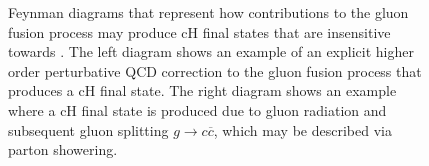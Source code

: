 \begin{figure}
\begin{subfigure}{0.48\textwidth}
    \end{subfigure}
    \caption{Feynman diagrams that represent how contributions to the gluon fusion process may produce cH final states that are insensitive towards \kappac. The left diagram shows an example of an explicit higher order perturbative QCD correction to the gluon fusion process that produces a cH final state. The right diagram shows an example where a cH final state is produced due to gluon radiation and subsequent gluon splitting $g\rightarrow c\overline{c}$, which may be described via parton showering.}
    \label{fig:ggHFeynmanInsensitive}
\end{figure}

